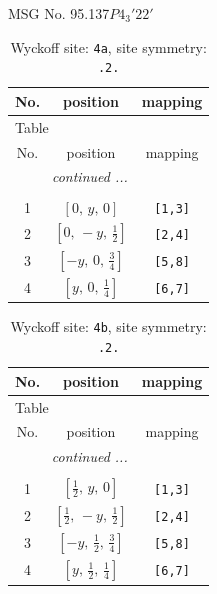 \documentclass[fleqn,8pt]{jsarticle}
\begin{document}
\setcounter{MaxMatrixCols}{32}

\renewcommand{\tablename}{Table~}
\renewcommand{\figurename}{Figure~}
\begin{center}
\LARGE
MSG No. 95.137\quad$P4_{3}'22'$
\end{center}
\renewcommand{\arraystretch}{1.2}
\begin{longtable}{ccc}
\caption{Wyckoff site: {\tt 4a}, site symmetry: {\tt .2.}}
 \\
 \hline \hline
No. & position & mapping \\ \hline \endfirsthead

\multicolumn{2}{l}{\tablename\ \thetable{}} \\
 \hline \hline
No. & position & mapping \\ \hline \endhead

 \hline \hline
\multicolumn{2}{r}{\footnotesize\it continued ...} \\ \endfoot

 \hline \hline
\multicolumn{2}{r}{} \\ \endlastfoot

1 & $\left[ 0,\, y,\, 0 \right]$ & {\tt [1,3]} \\ \hline
2 & $\left[ 0,\, - y,\, \frac{1}{2} \right]$ & {\tt [2,4]} \\ \hline
3 & $\left[ - y,\, 0,\, \frac{3}{4} \right]$ & {\tt [5,8]} \\ \hline
4 & $\left[ y,\, 0,\, \frac{1}{4} \right]$ & {\tt [6,7]} \\
\end{longtable}
\renewcommand{\arraystretch}{1.2}
\begin{longtable}{ccc}
\caption{Wyckoff site: {\tt 4b}, site symmetry: {\tt .2.}}
 \\
 \hline \hline
No. & position & mapping \\ \hline \endfirsthead

\multicolumn{2}{l}{\tablename\ \thetable{}} \\
 \hline \hline
No. & position & mapping \\ \hline \endhead

 \hline \hline
\multicolumn{2}{r}{\footnotesize\it continued ...} \\ \endfoot

 \hline \hline
\multicolumn{2}{r}{} \\ \endlastfoot

1 & $\left[ \frac{1}{2},\, y,\, 0 \right]$ & {\tt [1,3]} \\ \hline
2 & $\left[ \frac{1}{2},\, - y,\, \frac{1}{2} \right]$ & {\tt [2,4]} \\ \hline
3 & $\left[ - y,\, \frac{1}{2},\, \frac{3}{4} \right]$ & {\tt [5,8]} \\ \hline
4 & $\left[ y,\, \frac{1}{2},\, \frac{1}{4} \right]$ & {\tt [6,7]} \\
\end{longtable}
\end{document}
